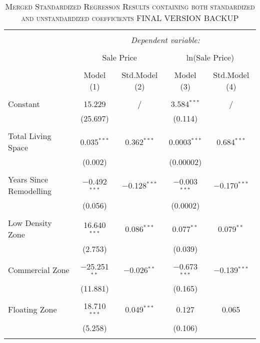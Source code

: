 \documentclass[a4paper]{article}
\begin{document}
\begin{table}[!htbp] \centering 
\begin{adjustwidth}{-0.0cm}{-0cm}
\begin{threeparttable}
\small
\captionsetup{font=small, justification=raggedright,singlelinecheck=false}
\caption{\textsc{Merged Standardized Regresson Results containing both standardized and unstandardized coefficients FINAL VERSION BACKUP}}
\centering 
  \label{}
\small 
\begin{tabular}{@{\extracolsep{-1pt}}lcccc} 
\\[-5.8ex]\hline 
\hline \\[-1.8ex] 
 & \multicolumn{4}{c}{\textit{Dependent variable:}} \\ 
\cline{2-5} 
\\[-1.8ex] & \multicolumn{2}{c}{Sale Price} & \multicolumn{2}{c}{ln(Sale Price)} \\ 
\\[-1.8ex] & Model (1) & Std.Model (2) & Model (3) & Std.Model (4)\\ 
\hline \\[-1.8ex] 
 Constant & 15.229 & / & 3.584$^{***}$ & / \\ 
  & (25.697) &  & (0.114) &  \\ 
  & & & & \\ 
 Total Living Space & 0.035$^{***}$ & 0.362$^{***}$ & 0.0003$^{***}$ & 0.684$^{***}$ \\ 
  & (0.002) &  & (0.00002) &  \\ 
  & & & & \\ 
 Years Since Remodelling & $-$0.492$^{***}$ & $-$0.128$^{***}$ & $-$0.003$^{***}$ & $-$0.170$^{***}$ \\ 
  & (0.056) &  & (0.0002) &  \\ 
  & & & & \\ 
 Low Density Zone & 16.640$^{***}$ & 0.086$^{***}$ & 0.077$^{**}$ & 0.079$^{**}$ \\ 
  & (2.753) &  & (0.039) &  \\ 
  & & & & \\ 
 Commercial Zone & $-$25.251$^{**}$ & $-$0.026$^{**}$ & $-$0.673$^{***}$ & $-$0.139$^{***}$ \\ 
  & (11.881) &  & (0.165) &  \\ 
  & & & & \\ 
 Floating Zone & 18.710$^{***}$ & 0.049$^{***}$ & 0.127 & 0.065 \\ 
  & (5.258) &  & (0.106) &  \\ 
  & & & & \\ 

\end{tabular}
\end{threeparttable}
\end{adjustwidth}
\end{table}
\end{document}
